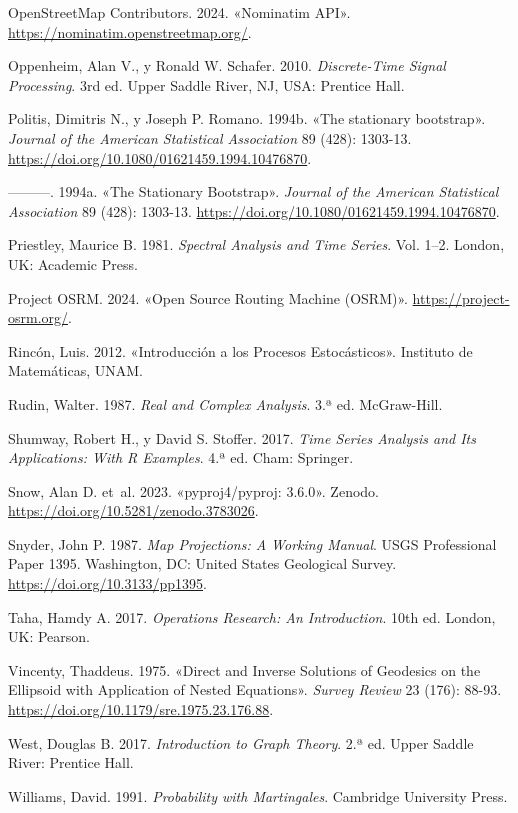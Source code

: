 \documentclass[
  spanish,
  us-letterpaper,
]{scrreprt}
\newlength{\cslhangindent}
\newenvironment{CSLReferences}[2] %
 {\begin{list}{}{%
  \setlength{\itemindent}{0pt}
  \setlength{\leftmargin}{0pt}
  \setlength{\parsep}{0pt}
  \ifodd #1
   \setlength{\leftmargin}{\cslhangindent}
   \setlength{\itemindent}{-1\cslhangindent}
  \fi
  \setlength{\itemsep}{#2\baselineskip}}}
 {\end{list}}
\numberwithin{equation}{section}
\begin{document}
\begin{CSLReferences}{1}{0}
OpenStreetMap Contributors. 2024. {«Nominatim API»}.
\url{https://nominatim.openstreetmap.org/}.

Oppenheim, Alan V., y Ronald W. Schafer. 2010. \emph{Discrete-Time
Signal Processing}. 3rd ed. Upper Saddle River, NJ, USA: Prentice Hall.

Politis, Dimitris N., y Joseph P. Romano. 1994b. {«The stationary
bootstrap»}. \emph{Journal of the American Statistical Association} 89
(428): 1303-13. \url{https://doi.org/10.1080/01621459.1994.10476870}.

---------. 1994a. {«The Stationary Bootstrap»}. \emph{Journal of the
American Statistical Association} 89 (428): 1303-13.
\url{https://doi.org/10.1080/01621459.1994.10476870}.

Priestley, Maurice B. 1981. \emph{Spectral Analysis and Time Series}.
Vol. 1--2. London, UK: Academic Press.

Project OSRM. 2024. {«Open Source Routing Machine (OSRM)»}.
\url{https://project-osrm.org/}.

Rincón, Luis. 2012. {«Introducción a los Procesos Estocásticos»}.
Instituto de Matemáticas, UNAM.

Rudin, Walter. 1987. \emph{Real and Complex Analysis}. 3.ª ed.
McGraw-Hill.

Shumway, Robert H., y David S. Stoffer. 2017. \emph{Time Series Analysis
and Its Applications: With R Examples}. 4.ª ed. Cham: Springer.

Snow, Alan D. et~al. 2023. {«pyproj4/pyproj: 3.6.0»}. Zenodo.
\url{https://doi.org/10.5281/zenodo.3783026}.

Snyder, John P. 1987. \emph{Map Projections: A Working Manual}. USGS
Professional Paper 1395. Washington, DC: United States Geological
Survey. \url{https://doi.org/10.3133/pp1395}.

Taha, Hamdy A. 2017. \emph{Operations Research: An Introduction}. 10th
ed. London, UK: Pearson.

Vincenty, Thaddeus. 1975. {«Direct and Inverse Solutions of Geodesics on
the Ellipsoid with Application of Nested Equations»}. \emph{Survey
Review} 23 (176): 88-93.
\url{https://doi.org/10.1179/sre.1975.23.176.88}.

West, Douglas B. 2017. \emph{Introduction to Graph Theory}. 2.ª ed.
Upper Saddle River: Prentice Hall.

Williams, David. 1991. \emph{Probability with Martingales}. Cambridge
University Press.

\end{CSLReferences}
\end{document}
